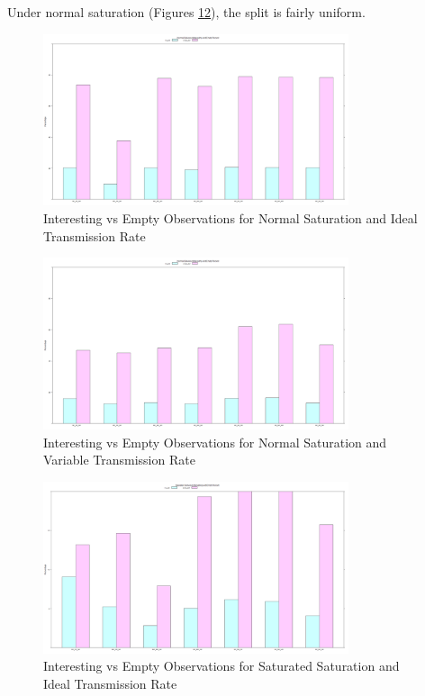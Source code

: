 	Under normal saturation (Figures \ref{fig:sim:res:norm:ideal:emptint}\ref{fig:sim:res:norm:variable:emptint}), the split is fairly uniform. 


	\begin{figure}[H]
	\centering
	\includegraphics[width=0.8\textwidth]{Chap7/figures/plots/normal_ideal/emptvsint_percent.png}
	\caption{Interesting vs Empty Observations for Normal Saturation and Ideal Transmission Rate}
	\label{fig:sim:res:norm:ideal:emptint}
	\end{figure}

	\begin{figure}[H]
	\centering
	\includegraphics[width=0.8\textwidth]{Chap7/figures/plots/normal_variable/emptvsint_percent.png}
	\caption{Interesting vs Empty Observations for Normal Saturation and Variable Transmission Rate}
	\label{fig:sim:res:norm:variable:emptint}
	\end{figure}

	\begin{figure}[H]
	\centering
	\includegraphics[width=0.8\textwidth]{Chap7/figures/plots/saturated_ideal/emptvsint_percent.png}
	\caption{Interesting vs Empty Observations for Saturated Saturation and Ideal Transmission Rate}
	\label{fig:sim:res:sat:ideal:emptint}
	\end{figure}


